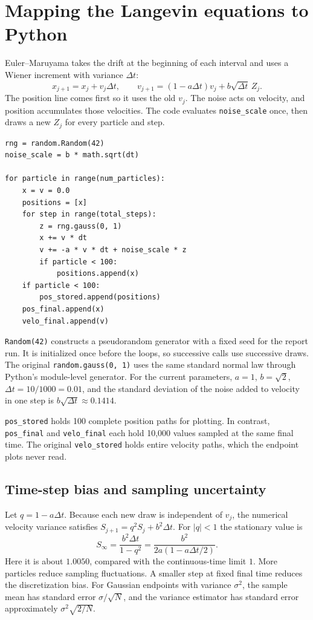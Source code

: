 \documentclass[11pt,a4paper]{article}
\begin{document}
\section{Mapping the Langevin equations to Python}
Euler--Maruyama takes the drift at the beginning of each interval and uses a
Wiener increment with variance \(\Delta t\):
\[
 x_{j+1}=x_j+v_j\Delta t,\qquad
 v_{j+1}=(1-a\Delta t)v_j+b\sqrt{\Delta t}\,Z_j.
\]
The position line comes first so it uses the old \(v_j\). The noise acts
on velocity, and position accumulates those velocities. The code evaluates
\texttt{noise\_scale} once, then draws a new \(Z_j\) for every particle and step.
\begin{lstlisting}
rng = random.Random(42)
noise_scale = b * math.sqrt(dt)

for particle in range(num_particles):
    x = v = 0.0
    positions = [x]
    for step in range(total_steps):
        z = rng.gauss(0, 1)
        x += v * dt
        v += -a * v * dt + noise_scale * z
        if particle < 100:
            positions.append(x)
    if particle < 100:
        pos_stored.append(positions)
    pos_final.append(x)
    velo_final.append(v)
\end{lstlisting}
\texttt{Random(42)} constructs a pseudorandom generator with a fixed seed for
the report run. It is initialized once before the loops, so successive calls
use successive draws. The original \texttt{random.gauss(0, 1)} uses the same
standard normal law through Python's module-level generator. For the current
parameters, \(a=1\), \(b=\sqrt2\), \(\Delta t=10/1000=0.01\), and the
standard deviation of the noise added to velocity in one step is
\(b\sqrt{\Delta t}\approx0.1414\).

\texttt{pos\_stored} holds 100 complete position paths for plotting. In
contrast, \texttt{pos\_final} and \texttt{velo\_final} each hold 10,000 values
sampled at the same final time. The original \texttt{velo\_stored} holds entire
velocity paths, which the endpoint plots never read.

\subsection*{Time-step bias and sampling uncertainty}
Let \(q=1-a\Delta t\). Because each new draw is independent of \(v_j\), the
numerical velocity variance satisfies \(S_{j+1}=q^2 S_j+b^2\Delta t\).
For \(|q|<1\) the stationary value is
\[
 S_\infty=\frac{b^2\Delta t}{1-q^2}
         =\frac{b^2}{2a(1-a\Delta t/2)}.
\]
Here it is about \(1.0050\), compared with the continuous-time limit \(1\).
More particles reduce sampling fluctuations. A smaller step at fixed final
time reduces the discretization bias. For Gaussian endpoints with variance
\(\sigma^2\), the sample mean has standard error \(\sigma/\sqrt N\), and the
variance estimator has standard error approximately \(\sigma^2\sqrt{2/N}\).
\newpage
\end{document}

